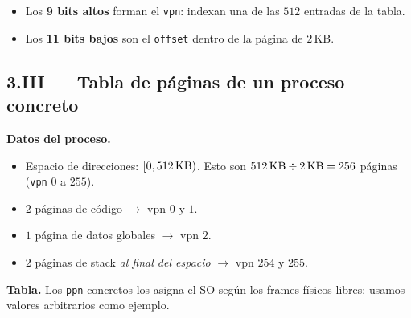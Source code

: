 \documentclass[11pt,a4paper]{article}
\begin{document}
\begin{center}
\end{center}

\begin{itemize}[leftmargin=*,nosep]
    \item Los \textbf{9 bits altos} forman el \texttt{vpn}: indexan
        una de las $512$ entradas de la tabla.
    \item Los \textbf{11 bits bajos} son el \texttt{offset} dentro de
        la página de $2$\,KB.
\end{itemize}

\subsection*{3.III --- Tabla de páginas de un proceso concreto}

\textbf{Datos del proceso.}
\begin{itemize}[leftmargin=*,nosep]
    \item Espacio de direcciones: $[0, 512\text{\,KB})$. Esto son
        $512\text{\,KB} \div 2\text{\,KB} = 256$ páginas (\texttt{vpn}
        $0$ a $255$).
    \item $2$ páginas de código $\to$ vpn $0$ y $1$.
    \item $1$ página de datos globales $\to$ vpn $2$.
    \item $2$ páginas de stack \emph{al final del espacio}
        $\to$ vpn $254$ y $255$.
\end{itemize}

\textbf{Tabla.} Los \texttt{ppn} concretos los asigna el SO según los
frames físicos libres; usamos valores arbitrarios como ejemplo.
\end{document}
